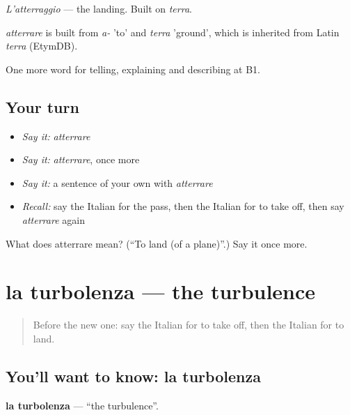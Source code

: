 \emph{L'atterraggio} — the landing. Built on \emph{terra}.

\begin{cousinweb}
\emph{atterrare} is built from \emph{a-} 'to' and \emph{terra} 'ground', which is inherited from Latin \emph{terra} (EtymDB).
\end{cousinweb}

\begin{grammarlens}[title={What you've built}]
One more word for telling, explaining and describing at B1.
\end{grammarlens}

\subsection*{Your turn}
\begin{itemize}
\raggedright
  \item \emph{Say it:} \emph{atterrare}
  \item \emph{Say it:} \emph{atterrare}, once more
  \item \emph{Say it:} a sentence of your own with \emph{atterrare}
  \item \emph{Recall:} say the Italian for the pass, then the Italian for to take off, then say \emph{atterrare} again
\end{itemize}

\begin{tcolorbox}[breakable,colback=teal!4,colframe=teal!35!black,title={Before you move on}]
What does atterrare mean? (\textquotedblleft{}To land (of a plane)\textquotedblright{}.) Say it once more.
\end{tcolorbox}
\section[la turbolenza]{la turbolenza — the turbulence}

\label{lesson:IT-C428-turbolenza}



\begin{quote}
Before the new one: say the Italian for to take off, then the Italian for to land.
\end{quote}

\subsection*{You'll want to know: la turbolenza}
\textbf{la turbolenza} — \textquotedblleft{}the turbulence\textquotedblright{}.

